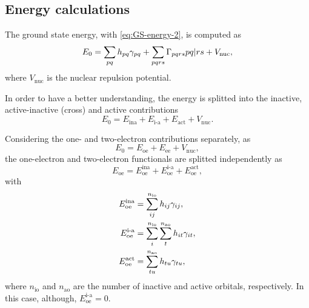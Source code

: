 \subsection{Energy calculations}
The ground state energy, with \cref{eq:GS-energy-2}, is computed as
\begin{equation}
    E_0 = 
    \sum_{pq} h_{pq} \fordm_{pq}
    +
    \sum_{pqrs}
    \sordm_{pqrs} \PBraket{pq | rs}
    + V_{\text{nuc}}
    ,
\end{equation}
where $V_{\text{nuc}}$ is the nuclear repulsion potential.

In order to have a better understanding, the energy is splitted into the
inactive, active-inactive (cross) and active contributions
\begin{equation} \label{eq:E0-splitted}
    E_0 =
    E_{\text{ina}} + E_{\text{i-a}} + E_{\text{act}} + V_{\text{nuc}}
    .
\end{equation}

Considering the one- and two-electron contributions separately, as 
\begin{equation}
    E_0 =
    E_{\text{oe}} + E_{\text{ee}} + V_{\text{nuc}}
    ,
\end{equation}
the one-electron and two-electron functionals are splitted independently as
\begin{equation} \label{eq:Eoe-splitted}
    E_{\text{oe}} = 
    E_{\text{oe}}^{\text{ina}} + E_{\text{oe}}^{\text{i-a}} + E_{\text{oe}}^{\text{act}}
    ,
\end{equation}
with
\begin{align}
    E_{\text{oe}}^{\text{ina}}
    &=
    \sum_{ij}^{n_{\text{io}}} h_{ij} \gamma_{ij}
    ,
    \\
    E_{\text{oe}}^{\text{i-a}}
    &=
    \sum_{i}^{n_{\text{io}}} \sum_{t}^{n_{\text{ao}}} h_{it} \gamma_{it}
    ,
    \\
    E_{\text{oe}}^{\text{act}}
    &=
    \sum_{tu}^{n_{\text{ao}}} h_{tu} \gamma_{tu}
    ,
\end{align}
where $n_{\text{io}}$ and $n_{\text{ao}}$ are the number of inactive and
active orbitals, respectively.
In this case, although, $E_{\text{oe}}^{\text{i-a}} = 0$.

